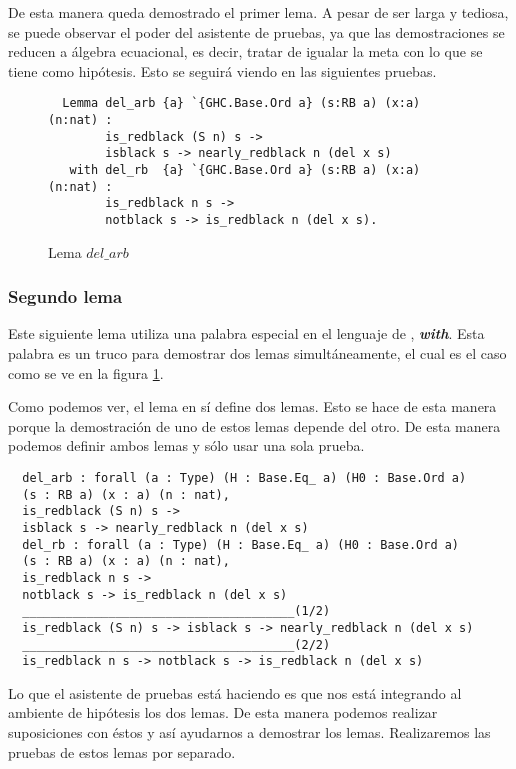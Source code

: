 De esta manera queda demostrado el primer lema. A pesar de ser larga y
tediosa, se puede observar el poder del asistente de pruebas, ya que las demostraciones se reducen
a álgebra ecuacional, es decir, tratar de igualar la meta con lo que se tiene como hip\'otesis.
Esto se seguirá viendo en las siguientes pruebas.

\begin{figure}[!ht]
  \centering
  \captionsetup{justification=centering}
  \begin{verbatim}
  Lemma del_arb {a} `{GHC.Base.Ord a} (s:RB a) (x:a) (n:nat) :
        is_redblack (S n) s ->
        isblack s -> nearly_redblack n (del x s)
   with del_rb  {a} `{GHC.Base.Ord a} (s:RB a) (x:a) (n:nat) :
        is_redblack n s ->
        notblack s -> is_redblack n (del x s).
  \end{verbatim}
  \caption{Lema $del\_arb$}
  \label{lema_6}
  \end{figure}

\subsubsection{Segundo lema}
Este siguiente lema utiliza una palabra especial en el lenguaje de {\coq}, \emph{\textbf{with}}. Esta palabra
es un truco para demostrar dos lemas simultáneamente, el cual es el caso como se ve en la figura
\ref{lema_6}.

Como podemos ver, el lema en s\'i define dos lemas. Esto se hace de esta manera porque la
demostraci\'on de uno de estos lemas depende del otro. De esta manera podemos definir ambos lemas y
s\'olo usar una sola prueba.

\begin{verbatim}
  del_arb : forall (a : Type) (H : Base.Eq_ a) (H0 : Base.Ord a)
  (s : RB a) (x : a) (n : nat),
  is_redblack (S n) s ->
  isblack s -> nearly_redblack n (del x s)
  del_rb : forall (a : Type) (H : Base.Eq_ a) (H0 : Base.Ord a)
  (s : RB a) (x : a) (n : nat),
  is_redblack n s ->
  notblack s -> is_redblack n (del x s)
  ______________________________________(1/2)
  is_redblack (S n) s -> isblack s -> nearly_redblack n (del x s)
  ______________________________________(2/2)
  is_redblack n s -> notblack s -> is_redblack n (del x s)
\end{verbatim}

Lo que el asistente de pruebas est\'a haciendo es que nos est\'a integrando al ambiente de hip\'otesis
los dos lemas. De esta manera podemos realizar suposiciones con \'estos y as\'i ayudarnos a demostrar
los lemas. Realizaremos las pruebas de estos lemas por separado.

